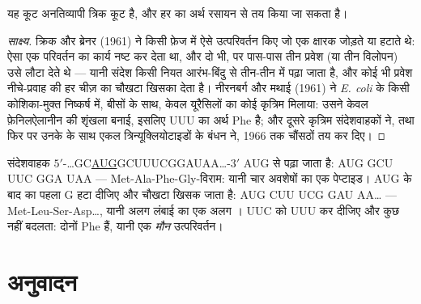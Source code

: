 \begin{proposition}[कूट कैसे पढ़ा गया]\label{prop:b1:gene-expression:nirenberg}
यह कूट अनतिव्यापी त्रिक कूट है, और हर  का अर्थ रसायन से तय किया जा
सकता है।
\end{proposition}
\begin{proof}[साक्ष्य]
क्रिक और ब्रेनर (1961) ने किसी फ़ेज  में ऐसे उत्परिवर्तन किए जो एक
क्षारक जोड़ते या हटाते थे: ऐसा एक परिवर्तन  का कार्य नष्ट कर देता था,
और दो भी, पर पास-पास तीन प्रवेश (या तीन विलोपन) उसे लौटा देते थे --- यानी
संदेश किसी नियत आरंभ-बिंदु से तीन-तीन में पढ़ा जाता है, और कोई भी प्रवेश
नीचे-प्रवाह की हर चीज़ का चौखटा खिसका देता है।
नीरनबर्ग और मथाई (1961) ने \emph{E. coli} के किसी कोशिका-मुक्त निष्कर्ष
में, बीसों  के साथ, केवल यूरैसिलों का कोई कृत्रिम  मिलाया:
उसने केवल फ़ेनिलऐलानीन की शृंखला बनाई, इसलिए UUU का अर्थ Phe है; और दूसरे
कृत्रिम संदेशवाहकों ने, तथा फिर  पर उनके  के साथ एकल
त्रिन्यूक्लियोटाइडों के बंधन ने, 1966 तक चौंसठों तय कर दिए।
\end{proof}

\begin{example}[कोई संदेश पढ़ना]\label{ex:b1:gene-expression:reading}
संदेशवाहक $5'$-\ldots{}GC\underline{AUG}GCUUUCGGAUAA\ldots{}-$3'$
AUG से पढ़ा जाता है: AUG GCU UUC GGA UAA --- Met-Ala-Phe-Gly-विराम:
यानी चार अवशेषों का एक पेप्टाइड। AUG के बाद का पहला G हटा दीजिए और चौखटा
खिसक जाता है: AUG CUU UCG GAU AA\ldots{} --- Met-Leu-Ser-Asp\ldots, यानी
अलग लंबाई का एक अलग । UUC को UUU कर दीजिए और कुछ नहीं
बदलता: दोनों Phe हैं, यानी एक \emph{मौन} उत्परिवर्तन।
\end{example}

\section{अनुवादन}


